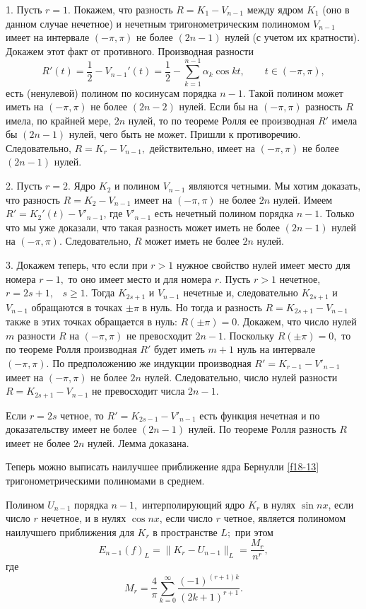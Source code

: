 1. Пусть $r=1.$ Покажем, что разность $R=K_1-V_{n-1}$ между ядром $K_1$ (оно в данном
случае нечетное) и нечетным тригонометрическим
  полиномом $V_{n-1}$ имеет на интервале $(-\pi,\pi)$ не более $(2n-1)$
  нулей (с учетом их кратности).
  Докажем этот факт от противного. Производная разности
 $$
 R'(t)=\frac{1}{2} -V_{n-1}'(t)=\frac{1}{2} -\sum\limits_{k=1}^{n-1}
 \alpha_k\cos kt,\qquad t\in (-\pi,\pi),
 $$
 есть (ненулевой) полином по  косинусам порядка $n-1$. Такой полином
 может иметь на $(-\pi,\pi)$
 не более $(2n-2)$ нулей. Если бы на $(-\pi,\pi)$ разность $R$ имела,
 по крайней мере,  $2n$
 нулей, то по теореме Ролля ее производная  $R'$ имела бы $(2n-1)$
 нулей, чего быть не может. Пришли к противоречию. Следовательно,
 $R=K_r-V_{n-1},$ действительно,
 имеет на $(-\pi,\pi)$ не более $(2n-1)$ нулей.

 2. Пусть $r=2.$ Ядро  $K_2$ и полином $V_{n-1}$  являются четными.
 Мы хотим  доказать, что разность
 $R=K_2-V_{n-1}$ имеет на $(-\pi,\pi)$
 не более $2n$ нулей.
 Имеем  $R'=K_2'(t)-V'_{n-1}$, где
 $V'_{n-1}$ есть  нечетный полином порядка $n-1$. Только что  мы уже доказали, что такая
 разность может иметь не более $(2n-1)$ нулей на $(-\pi,\pi).$
 Следовательно, $R$ может иметь не более $2n$ нулей.

 3. Докажем теперь, что если при  $r>1$ нужное свойство нулей  имеет место для номера $r-1,$ то оно имеет место и для номера $r.$    Пусть $r>1$ нечетное,
 $r=2s+1,$~ $s\ge 1.$
 Тогда $K_{2s+1}$ и $V_{n-1}$ нечетные и, следовательно  $K_{2s+1}$
 и $V_{n-1}$ обращаются в точках $\pm \pi$
 в нуль. Но тогда и разность  $R=K_{2s+1}-V_{n-1}$ также в этих точках обращается в нуль:
 $R(\pm \pi)=0.$
  Докажем, что число нулей $m$ разности  $R$ на $(-\pi,\pi)$ не превосходит
  $2n-1.$ Поскольку $R(\pm\pi)=0,$ то по теореме Ролля производная $R'$
   будет иметь  $m+1$ нуль на интервале $(-\pi,\pi).$ По  предположению же
   индукции производная  $R'=K_{r-1}-V'_{n-1}$
 имеет на $(-\pi,\pi)$ не более $2n$ нулей. Следовательно,  число нулей
 разности  $R=K_{2s+1}-V_{n-1}$ не превосходит числа $2n-1.$


 Если $r=2s$ четное, то $R'=K_{2s-1}-V'_{n-1}$ есть функция нечетная и по доказательству
  имеет не более $(2n-1)$ нулей. По теореме Ролля  разность $R$ имеет не более $2n$
 нулей. Лемма доказана.

 Теперь можно выписать наилучшее приближение ядра Бернулли {\eqref{f18-13}} тригонометрическими полиномами в
 среднем.

 \begin{teo}\label{t18-2}
 Полином $U_{n-1}$ порядка $n-1,$ интерполирующий ядро  $K_r$
 в нулях $\sin nx$, если число $r$ нечетное, и в нулях  $\cos nx$, если число $r$ четное,
 является полиномом наилучшего приближения для $K_r$ в пространстве $L;$ при этом
 \begin{equation}\label{f18-14}
 E_{n-1}(f)_L=\|K_r-U_{n-1}\|_L=\frac{M_r}{n^r}, %
 \end{equation}
 где
 \begin{equation}\label{f18-15}
 M_r=\frac{4}{\pi}\sum\limits_{k=0}^{\infty}
 \frac{(-1)^{(r+1)k}}{(2k+1)^{r+1}}. %
 \end{equation}
 \end{teo}




